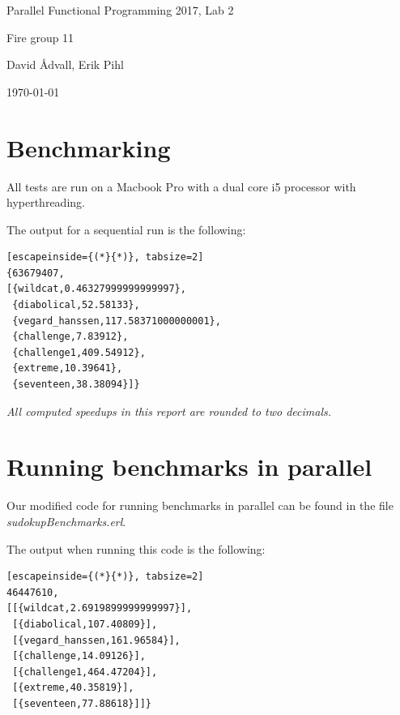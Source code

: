 \documentclass[a4paper]{article}
\begin{document}
\begin{titlepage}
\centering
\LARGE{Parallel Functional Programming 2017, Lab 2}

\bigskip

\Large{Fire group 11}

\bigskip

\Large{David Ådvall, \linebreak
Erik Pihl}

\bigskip

\Large{\today}

\end{titlepage}

\newpage
\section{Benchmarking}
All tests are run on a Macbook Pro with a dual core i5 processor with hyperthreading.

The output for a sequential run is the following:
\begin{lstlisting}[escapeinside={(*}{*)}, tabsize=2]
{63679407,
[{wildcat,0.46327999999999997},
 {diabolical,52.58133},
 {vegard_hanssen,117.58371000000001},
 {challenge,7.83912},
 {challenge1,409.54912},
 {extreme,10.39641},
 {seventeen,38.38094}]}
 \end{lstlisting}

\textit{All computed speedups in this report are rounded to two decimals.}

\section{Running benchmarks in parallel}
Our modified code for running benchmarks in parallel can be found in the file \textit{sudoku\textunderscore pBenchmarks.erl}.

The output when running this code is the following:
\begin{lstlisting}[escapeinside={(*}{*)}, tabsize=2]
46447610,
[[{wildcat,2.6919899999999997}],
 [{diabolical,107.40809}],
 [{vegard_hanssen,161.96584}],
 [{challenge,14.09126}],
 [{challenge1,464.47204}],
 [{extreme,40.35819}],
 [{seventeen,77.88618}]]}
\end{lstlisting}
\end{document}
